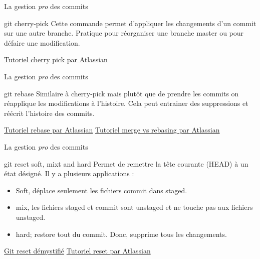 \documentclass[11pt]{beamer}
\begin{document}
\begin{frame}[fragile]{La gestion \textit{pro} des commits}
	\begin{block}{git cherry-pick}
		Cette commande permet d'appliquer les changements d'un commit sur une autre branche. Pratique pour réorganiser une branche master ou pour défaire une modification. 
	\end{block}
	\href{https://www.atlassian.com/git/tutorials/cherry-pick}{Tutoriel cherry pick par Atlassian}
\end{frame}

\begin{frame}[fragile]{La gestion \textit{pro} des commits}
	\begin{block}{git rebase}
		Similaire à cherry-pick mais plutôt que de prendre les commits on réapplique les modifications à l'histoire. Cela peut entrainer des suppressions et réécrit l'histoire des commits.
	\end{block}
	\href{https://fr.atlassian.com/git/tutorials/rewriting-history/git-rebase}{Tutoriel rebase par Atlassian}\newline
	\href{https://www.atlassian.com/git/tutorials/merging-vs-rebasing}{Tutoriel merge vs rebasing par Atlassian}
\end{frame}

\begin{frame}{La gestion \textit{pro} des commits}
	\begin{block}{git reset soft, mixt and hard}
		Permet de remettre la tête courante (HEAD) à un état désigné. Il y a plusieurs applications :
		\begin{itemize}
			\item Soft, déplace seulement les fichiers commit dans staged.
			\item mix, les fichiers staged et commit sont unstaged et ne touche pas aux fichiers unstaged. 
			\item hard; restore tout du commit. Donc, supprime tous les changements.
		\end{itemize}
	\end{block}
	\href{https://git-scm.com/book/fr/v2/Utilitaires-Git-Reset-d\%C3\%A9mystifi\%C3\%A99}{Git reset démystifié}\newline
	\href{https://www.atlassian.com/git/tutorials/undoing-changes/git-reset}{Tutoriel reset par Atlassian}
\end{frame}
\end{document}
